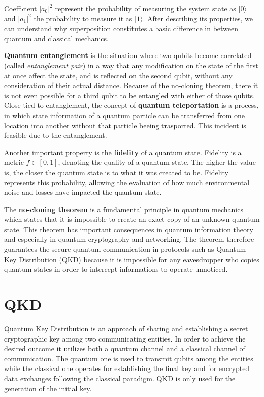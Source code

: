 \documentclass[12pt,a4paper] {report}
\begin{document}
		Coefficient $|a_0|^2$ represent the probability of measuring the system state as $|0\rangle$ and $|a_1|^2$ the probability to measure it
		as $|1\rangle$. After describing its properties, we can understand why superposition constitutes a 
		basic difference in between quantum and classical mechanics. 

		\textbf{Quantum entanglement} is the situation where two qubits become correlated
		(called \textit{entanglement pair}) in a way that
		any modification on the state of the first at once affect the state, and is reflected on the second qubit, 
		without any consideration of their actual distance. Because of the no-cloning theorem, there it is not even
		possible for a third qubit to be entangled with either of those qubits. Close tied to entanglement, the concept
		of \textbf{quantum teleportation} is a process, in which state information of a quantum particle can be transferred
		from one location into another without that particle beeing trasported.
		This incident is feasible due to the entanglement.
		
		Another important property is the \textbf{fidelity} of a quantum state.
		Fidelity is a metric  \( \textit{f} \in [0,1] \), denoting the quality of a quantum state.
		The higher the value is, the closer the quantum state is to what it was created to be.
		Fidelity represents this probability, allowing the evaluation of how much environmental noise
		and losses have impacted the quantum state.

		The \textbf{no-cloning theorem} is a fundamental principle in quantum mechanics 
		which states that it is impossible to create an exact copy of an unknown quantum state. 
		This theorem has important consequences in quantum information theory and especially in
		quantum cryptography and networking. The theorem therefore guarantees the secure quantum communication 
		in protocols such as Quantum Key Distribution (QKD) because it is impossible for any eavesdropper who copies
		quantum states in order to intercept informations to operate unnoticed.

		\section{QKD}
		Quantum Key Distribution is an approach of sharing and establishing a secret cryptographic key 
		among two communicating entities\cite{powergrid}.
		In order to achieve the desired outcome it utilizes both a quantum channel and a classical channel 
		of communication. The quantum one is used to transmit qubits among the entities while the classical 
		one operates for establishing the final key and for encrypted data exchanges following the classical 
		paradigm. QKD is only used for the generation of the initial key.
\end{document}
